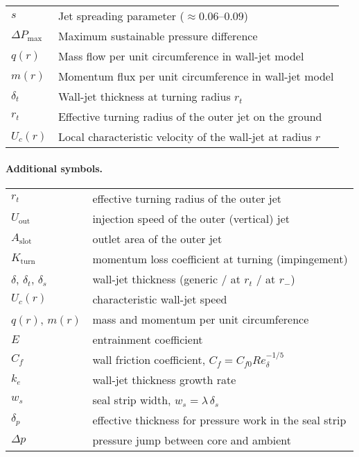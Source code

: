 \documentclass[11pt,a4paper]{article}
\begin{document}
\begin{tabular}{@{}ll@{}}
$s$ & Jet spreading parameter ($\approx0.06$--$0.09$) \\
$\Delta P_{\max}$ & Maximum sustainable pressure difference \\
$q(r)$ & Mass flow per unit circumference in wall-jet model \\
$m(r)$ & Momentum flux per unit circumference in wall-jet model \\
$\delta_t$ & Wall-jet thickness at turning radius $r_t$ \\
$r_t$ & Effective turning radius of the outer jet on the ground \\
$U_c(r)$ & Local characteristic velocity of the wall-jet at radius $r$\\
\bottomrule
\end{tabular}


\paragraph{Additional symbols.}
\begin{tabular}{ll}
\(r_t\) & effective turning radius of the outer jet \\
\(U_{\mathrm{out}}\) & injection speed of the outer (vertical) jet \\
\(A_{\mathrm{slot}}\) & outlet area of the outer jet \\
\(K_{\mathrm{turn}}\) & momentum loss coefficient at turning (impingement) \\
\(\delta\), \(\delta_t\), \(\delta_s\) & wall-jet thickness (generic / at \(r_t\) / at \(r_-\)) \\
\(U_c(r)\) & characteristic wall-jet speed \\
\(q(r)\), \(m(r)\) & mass and momentum per unit circumference \\
\(E\) & entrainment coefficient \\
\(C_f\) & wall friction coefficient, \(C_f=C_{f0} Re_\delta^{-1/5}\) \\
\(k_e\) & wall-jet thickness growth rate \\
\(w_s\) & seal strip width, \(w_s=\lambda\,\delta_s\) \\
\(\delta_p\) & effective thickness for pressure work in the seal strip \\
\(\Delta p\) & pressure jump between core and ambient
\end{tabular}
\end{document}
